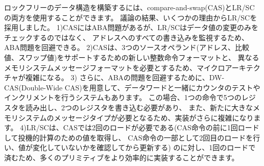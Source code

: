 \begin{commentary}
\begin{comment}
Both compare-and-swap (CAS) and LR/SC can be used to build lock-free
data structures.  After extensive discussion, we opted for LR/SC for
several reasons: 1) CAS suffers from the ABA problem, which LR/SC
avoids because it monitors all writes to the address rather than
only checking for changes in the data value; 2) CAS would also require
a new integer instruction format to support three source operands
(address, compare value, swap value) as well as a different memory
system message format, which would complicate microarchitectures; 3)
Furthermore, to avoid the ABA problem, other systems provide a
double-wide CAS (DW-CAS) to allow a counter to be tested and
incremented along with a data word. This requires reading five
registers and writing two in one instruction, and also a new larger
memory system message type, further complicating implementations; 4)
LR/SC provides a more efficient implementation of many primitives as
it only requires one load as opposed to two with CAS (one load before
the CAS instruction to obtain a value for speculative computation,
then a second load as part of the CAS instruction to check if value is
unchanged before updating).
\end{comment}

ロックフリーのデータ構造を構築するには、compare-and-swap(CAS)とLR/SCの両方を使用することができます。
議論の結果、いくつかの理由からLR/SCを採用しました。
1)CASにはABA問題があるが、LR/SCはデータ値の変更のみをチェックするのではなく、
アドレスへのすべての書き込みを監視するため、ABA問題を回避できる。
2)CASは、3つのソースオペランド(アドレス、比較値、スワップ値)をサポートするための新しい整数命令フォーマットと、
異なるメモリシステムメッセージフォーマットを必要とするため、マイクロアーキテクチャが複雑になる。
3) さらに、ABAの問題を回避するために、DW-CAS(Double-Wide CAS)を用意して、データワードと一緒にカウンタのテストやインクリメントを行うシステムもあります。
この場合、1つの命令で5つのレジスタを読み出し、2つのレジスタを書き込む必要があり、
また、新たに大きなメモリシステムのメッセージタイプが必要となるため、実装がさらに複雑になります。
4)LR/SCは、CASでは2回のロードが必要である(CAS命令の前に1回ロードして投機的計算のための値を取得し、
CAS命令の一部として2回目のロードを行い、値が変化していないかを確認してから更新する)
のに対し、1回のロードで済むため、多くのプリミティブをより効率的に実装することができます。

\begin{comment}
The main disadvantage of LR/SC over CAS is livelock, which we avoid,
under certain circumstances,
with an architected guarantee of eventual forward progress as
described below.  Another concern is whether the influence of the
current x86 architecture, with its DW-CAS, will complicate porting of
synchronization libraries and other software that assumes DW-CAS is
the basic machine primitive.  A possible mitigating factor is the
recent addition of transactional memory instructions to x86, which
might cause a move away from DW-CAS.
\end{comment}


\end{commentary}
